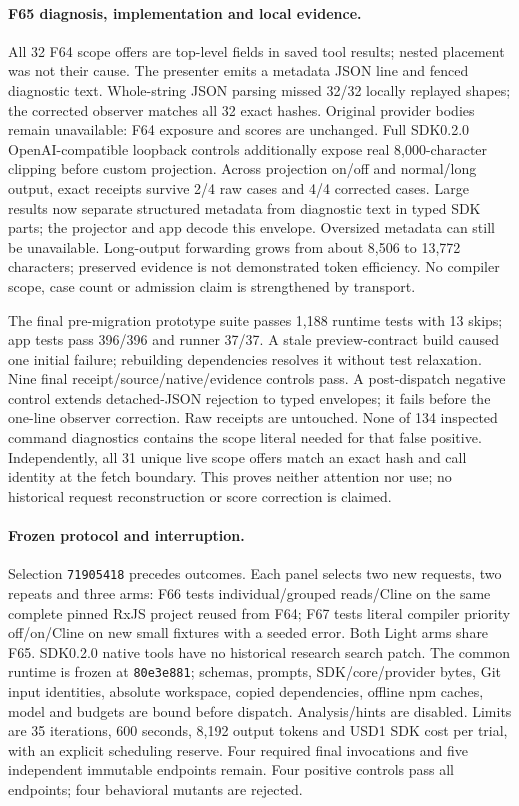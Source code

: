 \documentclass[11pt,a4paper]{article}
\newcommand{\code}[1]{\texttt{\detokenize{#1}}}
\begin{document}
\paragraph{F65 diagnosis, implementation and local evidence.}
All 32 F64 scope offers are top-level fields in saved tool results; nested
placement was not their cause. The presenter emits a metadata JSON line and
fenced diagnostic text. Whole-string JSON parsing missed 32/32 locally replayed
shapes; the corrected observer matches all 32 exact hashes. Original provider
bodies remain unavailable: F64 exposure and scores are unchanged.
Full SDK0.2.0 OpenAI-compatible loopback controls additionally expose real
8,000-character clipping before custom projection. Across projection on/off and
normal/long output, exact receipts survive 2/4 raw cases and 4/4 corrected cases.
Large \code{run_task} results now separate structured metadata from diagnostic
text in typed SDK parts; the projector and app decode this envelope. Oversized
metadata can still be unavailable. Long-output forwarding grows from about 8,506
to 13,772 characters; preserved evidence is not demonstrated token efficiency.
No compiler scope, case count or admission claim is strengthened by transport.

The final pre-migration prototype suite passes 1,188 runtime tests with 13 skips;
app tests pass 396/396 and runner 37/37. A stale preview-contract build caused one
initial failure; rebuilding dependencies resolves it without test relaxation.
Nine final receipt/source/native/evidence controls pass. A post-dispatch negative
control extends detached-JSON rejection to typed \code{input_text} envelopes;
it fails before the one-line observer correction. Raw receipts are untouched.
None of 134 inspected command diagnostics contains the scope literal needed for
that false positive. Independently, all 31 unique live scope offers match an exact
hash and call identity at the fetch boundary. This proves neither attention nor
use; no historical request reconstruction or score correction is claimed.

\paragraph{Frozen protocol and interruption.}
Selection \texttt{71905418} precedes outcomes. Each panel selects two new requests,
two repeats and three arms: F66 tests individual/grouped reads/Cline on the same
complete pinned RxJS project reused from F64; F67 tests literal compiler priority
off/on/Cline on new small fixtures with a seeded error. Both Light arms share F65.
SDK0.2.0 native tools have no historical research search patch. The common runtime
is frozen at \texttt{80e3e881}; schemas, prompts, SDK/core/provider bytes, Git input
identities, absolute workspace, copied dependencies, offline npm caches, model
\code{openai-codex/gpt-5.6-luna/high} and budgets are bound before dispatch.
Analysis/hints are disabled. Limits are 35 iterations, 600 seconds, 8,192 output
tokens and USD1 SDK cost per trial, with an explicit scheduling reserve.
Four required final invocations and five independent immutable endpoints remain.
Four positive controls pass all endpoints; four behavioral mutants are rejected.
\end{document}
